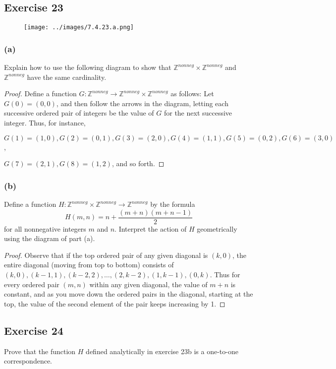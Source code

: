 \documentclass[14pt]{extarticle}
\newcommand{\Z}{\mathbb{Z}}
\begin{document}
\subsection{Exercise 23}
\begin{figure}[ht!]
    \centering
    \texttt{[image: ../images/7.4.23.a.png]}
\end{figure}

\subsubsection{(a)}
Explain how to use the following diagram to show that \(\Z^{nonneg} \times \Z^{nonneg}\) and \(\Z^{nonneg}\) have
the same cardinality.

\begin{proof}
    Define a function \(G: \Z^{nonneg} \to \Z^{nonneg} \times \Z^{nonneg}\) as follows: Let \(G(0) = (0, 0)\), and then
    follow the arrows in the diagram, letting each successive ordered pair of integers be the value of $G$ for the next successive integer. Thus, for instance,

    \(G(1) = (1, 0), G(2) = (0, 1), G(3) = (2, 0), G(4) = (1, 1), G(5) = (0, 2), G(6) = (3, 0)\),

    \(G(7) = (2, 1), G(8) = (1, 2)\), and so forth.
\end{proof}

\subsubsection{(b)}
Define a function \(H: \Z^{nonneg} \times \Z^{nonneg} \to \Z^{nonneg}\) by the formula
\[
    H(m, n) = n + \frac{(m+n)(m+n-1)}{2}
\]
for all nonnegative integers $m$ and $n$. Interpret the action of $H$ geometrically using the diagram of part (a).

\begin{proof}
    Observe that if the top ordered pair of any given diagonal is $(k, 0)$, the entire diagonal (moving from top to
    bottom) consists of \((k, 0), (k - 1, 1), (k - 2, 2), \ldots, (2, k - 2), (1, k - 1), (0, k)\). Thus for every
    ordered pair \((m, n)\) within any given diagonal, the value of \(m + n\) is constant, and as you move down the
    ordered pairs in the diagonal, starting at the top, the value of the second element of the pair keeps increasing by 1.
\end{proof}

\subsection{Exercise 24}
Prove that the function $H$ defined analytically in exercise 23b is a one-to-one correspondence.
\end{document}
